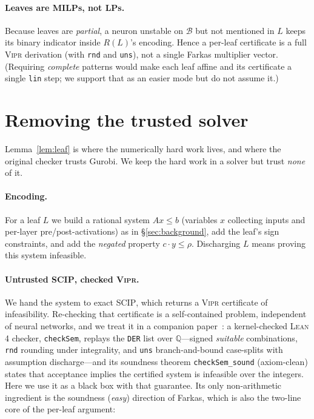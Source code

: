 \documentclass[runningheads]{llncs}
\newcommand{\Q}{\mathbb{Q}}
\newcommand{\reg}{R}
\newcommand{\dom}{\mathcal{B}}          %
\newcommand{\leaf}{L}
\newcommand{\vipr}{\textsc{Vipr}}
\newcommand{\scip}{\textsc{SCIP}}
\newcommand{\lean}{\textsc{Lean\,4}}
\newcommand{\code}[1]{\texttt{#1}}
\begin{document}
\paragraph{Leaves are MILPs, not LPs.}
Because leaves are \emph{partial}, a neuron unstable on $\dom$ but not mentioned in
$\leaf$ keeps its binary indicator inside $\reg(\leaf)$'s encoding. Hence a per-leaf
certificate is a full \vipr{} derivation (with \code{rnd} and \code{uns}), not a single
Farkas multiplier vector. (Requiring \emph{complete} patterns would make each leaf
affine and its certificate a single \code{lin} step; we support that as an easier mode
but do not assume it.)

\section{Removing the trusted solver}\label{sec:certificates}

Lemma~\ref{lem:leaf} is where the numerically hard work lives, and where the original
checker trusts Gurobi. We keep the hard work in a solver but trust \emph{none} of it.

\paragraph{Encoding.} For a leaf $\leaf$ we build a rational system
$A x \le b$ (variables $x$ collecting inputs and per-layer pre/post-activations) as in
\S\ref{sec:background}, add the leaf's sign constraints, and add the \emph{negated}
property $c\cdot y \le \rho$. Discharging $\leaf$ means proving this system infeasible.

\paragraph{Untrusted \scip{}, checked \vipr{}.} We hand the system to exact \scip{},
which returns a \vipr{} certificate of infeasibility. Re-checking that certificate is a
self-contained problem, independent of neural networks, and we treat it in a companion
paper~\cite{companion}: a kernel-checked \lean{} checker, \code{checkSem}, replays the
\code{DER} list over $\Q$---signed \emph{suitable} combinations, \code{rnd} rounding
under integrality, and \code{uns} branch-and-bound case-splits with assumption
discharge---and its soundness theorem \code{checkSem\_sound} (axiom-clean) states that
acceptance implies the certified system is infeasible over the integers. Here we use it
as a black box with that guarantee. Its only non-arithmetic ingredient is the soundness
(\emph{easy}) direction of Farkas, which is also the two-line core of the per-leaf
argument:
\end{document}

